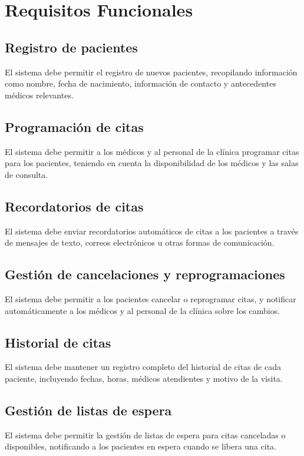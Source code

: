 \documentclass{article}
\theoremstyle{mytheoremstyle}
\theoremstyle{mytheoremstyle}
\theoremstyle{myproblemstyle}
\begin{document}
\newpage

\section{Requisitos Funcionales}
\subsection{Registro de pacientes}
El sistema debe permitir el registro de nuevos pacientes, recopilando información como nombre, fecha de nacimiento, información de contacto y antecedentes médicos relevantes.

\subsection{Programación de citas}
El sistema debe permitir a los médicos y al personal de la clínica programar citas para los pacientes, teniendo en cuenta la disponibilidad de los médicos y las salas de consulta.

\subsection{Recordatorios de citas}
El sistema debe enviar recordatorios automáticos de citas a los pacientes a través de mensajes de texto, correos electrónicos u otras formas de comunicación.

\subsection{Gestión de cancelaciones y reprogramaciones}
El sistema debe permitir a los pacientes cancelar o reprogramar citas, y notificar automáticamente a los médicos y al personal de la clínica sobre los cambios.

\subsection{Historial de citas}
El sistema debe mantener un registro completo del historial de citas de cada paciente, incluyendo fechas, horas, médicos atendientes y motivo de la visita.

\subsection{Gestión de listas de espera}
El sistema debe permitir la gestión de listas de espera para citas canceladas o disponibles, notificando a los pacientes en espera cuando se libera una cita.
\end{document}

